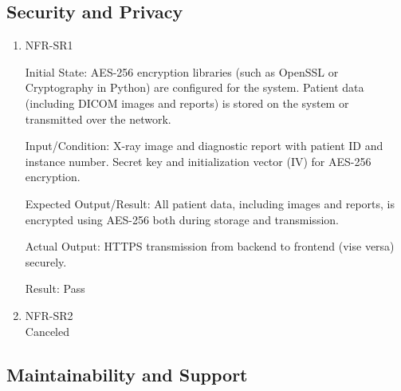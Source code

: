 \documentclass[12pt, titlepage]{article}
\begin{document}
\subsection{Security and Privacy}
\begin{enumerate}
\item{NFR-SR1\\}\label{NFR-SR1}

Initial State: AES-256 encryption libraries (such as OpenSSL or Cryptography in Python) are configured for the system. Patient data (including DICOM images and reports) is stored on the system or transmitted over the network.

Input/Condition: X-ray image and diagnostic report with patient ID and instance number. Secret key and initialization vector (IV) for AES-256 encryption.

Expected Output/Result: All patient data, including images and reports, is encrypted using AES-256 both during storage and transmission.

Actual Output: HTTPS transmission from backend to frontend (vise versa) securely.

Result: Pass

\item{NFR-SR2\\}\label{NFR-SR2}
Canceled
\end{enumerate}

\subsection{Maintainability and Support}
\end{document}
